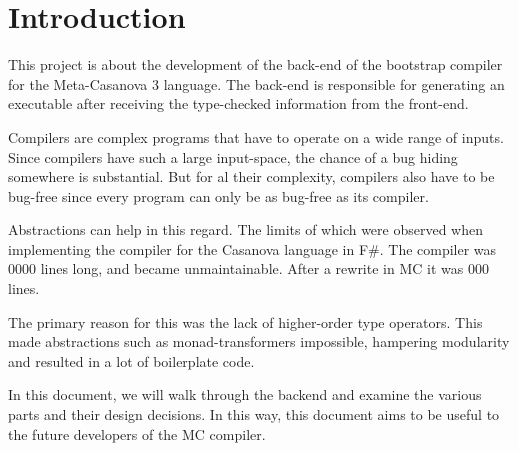 \section{Introduction}
This project is about the development of the back-end of the bootstrap compiler for the Meta-Casanova 3 language.
The back-end is responsible for generating an executable after receiving the type-checked information from the front-end.

Compilers are complex programs that have to operate on a wide range of inputs.
Since compilers have such a large input-space, the chance of a bug hiding somewhere is substantial. 
But for al their complexity, compilers also have to be bug-free since every program can only be as bug-free as its compiler.

Abstractions can help in this regard.
The limits of which were observed when implementing the compiler for the Casanova language in F\#.
The compiler was 0000 lines long, and became unmaintainable.
After a rewrite in MC it was 000 lines\cite{maggiore}.

The primary reason for this was the lack of higher-order type operators.
This made abstractions such as monad-transformers impossible, hampering modularity and resulted in a lot of boilerplate code.

In this document, we will walk through the backend and examine the various parts and their design decisions.
In this way, this document aims to be useful to the future developers of the MC compiler.



